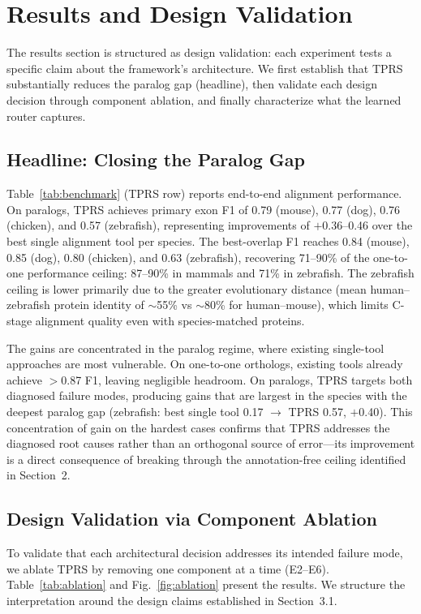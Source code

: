 \section{Results and Design Validation}

The results section is structured as design validation: each experiment tests a specific claim about the framework's architecture. We first establish that TPRS substantially reduces the paralog gap (headline), then validate each design decision through component ablation, and finally characterize what the learned router captures.

\subsection{Headline: Closing the Paralog Gap}

Table~\ref{tab:benchmark} (TPRS row) reports end-to-end alignment performance. On paralogs, TPRS achieves primary exon F1 of 0.79 (mouse), 0.77 (dog), 0.76 (chicken), and 0.57 (zebrafish), representing improvements of $+$0.36--0.46 over the best single alignment tool per species. The best-overlap F1 reaches 0.84 (mouse), 0.85 (dog), 0.80 (chicken), and 0.63 (zebrafish), recovering 71--90\% of the one-to-one performance ceiling: 87--90\% in mammals and 71\% in zebrafish. The zebrafish ceiling is lower primarily due to the greater evolutionary distance (mean human--zebrafish protein identity of $\sim$55\% vs $\sim$80\% for human--mouse), which limits C-stage alignment quality even with species-matched proteins.

The gains are concentrated in the paralog regime, where existing single-tool approaches are most vulnerable. On one-to-one orthologs, existing tools already achieve $>$0.87 F1, leaving negligible headroom. On paralogs, TPRS targets both diagnosed failure modes, producing gains that are largest in the species with the deepest paralog gap (zebrafish: best single tool 0.17 $\rightarrow$ TPRS 0.57, $+$0.40). This concentration of gain on the hardest cases confirms that TPRS addresses the diagnosed root causes rather than an orthogonal source of error—its improvement is a direct consequence of breaking through the annotation-free ceiling identified in Section~2.

\subsection{Design Validation via Component Ablation}

To validate that each architectural decision addresses its intended failure mode, we ablate TPRS by removing one component at a time (E2--E6). Table~\ref{tab:ablation} and Fig.~\ref{fig:ablation} present the results. We structure the interpretation around the design claims established in Section~3.1.

